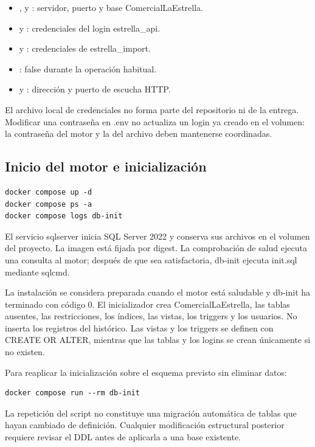 \begin{itemize}
\item {},  y : servidor, puerto y base ComercialLaEstrella.
\item {} y : credenciales del login estrella\_api.
\item {} y : credenciales de estrella\_import.
\item {}: false durante la operación habitual.
\item {} y : dirección y puerto de escucha HTTP.
\end{itemize}

El archivo local de credenciales no forma parte del repositorio ni de la entrega. Modificar una contraseña en .env no actualiza un login ya creado en el volumen: la contraseña del motor y la del archivo deben mantenerse coordinadas.

\subsection{Inicio del motor e inicialización}
\begin{lstlisting}
docker compose up -d
docker compose ps -a
docker compose logs db-init
\end{lstlisting}
El servicio sqlserver inicia SQL Server 2022 y conserva sus archivos en el volumen del proyecto. La imagen está fijada por digest. La comprobación de salud ejecuta una consulta al motor; después de que sea satisfactoria, db-init ejecuta init.sql mediante sqlcmd.

La instalación se considera preparada cuando el motor está saludable y db-init ha terminado con código 0. El inicializador crea ComercialLaEstrella, las tablas ausentes, las restricciones, los índices, las vistas, los triggers y los usuarios. No inserta los registros del histórico. Las vistas y los triggers se definen con CREATE OR ALTER, mientras que las tablas y los logins se crean únicamente si no existen.

Para reaplicar la inicialización sobre el esquema previsto sin eliminar datos:
\begin{lstlisting}
docker compose run --rm db-init
\end{lstlisting}
La repetición del script no constituye una migración automática de tablas que hayan cambiado de definición. Cualquier modificación estructural posterior requiere revisar el DDL antes de aplicarla a una base existente.

